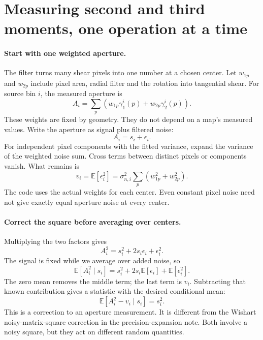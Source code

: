 \documentclass[11pt]{article}
\newcommand{\E}{\mathbb E}
\begin{document}
\section{Measuring second and third moments, one operation at a time}
\paragraph{Start with one weighted aperture.}
The filter turns many shear pixels into one number at a chosen center.
Let $w_{1p}$ and $w_{2p}$ include pixel area, radial filter and the rotation
into tangential shear. For source bin $i$, the measured aperture is
\begin{equation}
 A_i=\sum_p\left(w_{1p}\gamma^i_1(p)+w_{2p}\gamma^i_2(p)\right).
\end{equation}
These weights are fixed by geometry. They do not depend on a map's measured
values. Write the aperture as signal plus filtered noise:
\begin{equation}
 A_i=s_i+\epsilon_i.
\end{equation}
For independent pixel components with the fitted variance, expand the
variance of the weighted noise sum. Cross terms between distinct pixels
or components vanish. What remains is
\begin{equation}
 v_i=\E[\epsilon_i^2]
 =\sigma_{n,i}^2\sum_p\left(w_{1p}^2+w_{2p}^2\right).
\end{equation}
The code uses the actual weights for each center. Even constant pixel noise
need not give exactly equal aperture noise at every center.

\paragraph{Correct the square before averaging over centers.}
Multiplying the two factors gives
\begin{equation}
 A_i^2=s_i^2+2s_i\epsilon_i+\epsilon_i^2.
\end{equation}
The signal is fixed while we average over added noise, so
\begin{equation}
 \E[A_i^2\mid s_i]=s_i^2+2s_i\E[\epsilon_i]+\E[\epsilon_i^2].
\end{equation}
The zero mean removes the middle term; the last term is $v_i$. Subtracting
that known contribution gives a statistic with the desired conditional mean:
\begin{equation}
 \E[A_i^2-v_i\mid s_i]=s_i^2.
\end{equation}
This is a correction to an aperture measurement. It is different from the
Wishart noisy-matrix-square correction in the precision-expansion note.
Both involve a noisy square, but they act on different random quantities.
\end{document}
